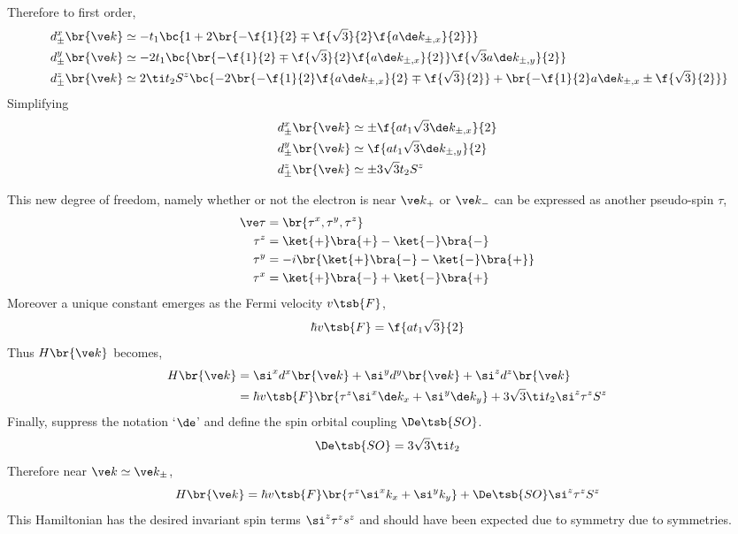 \documentclass{article}
\begin{document}
Therefore to first order,
\begin{align*}
    d_{\pm}^{x}\br{\ve k} &\simeq -t_1\bc{1 + 2\br{-\f{1}{2} \mp \f{\sqrt{3}}{2}\f{a\de k_{\pm,x}}{2}}} \\
    d_{\pm}^{y}\br{\ve k} &\simeq -2t_1\bc{\br{-\f{1}{2} \mp \f{\sqrt{3}}{2}\f{a\de k_{\pm,x}}{2}}\f{\sqrt{3}a\de k_{\pm, y}}{2}}\\\
    d_{\pm}^{z}\br{\ve k} &\simeq 2\ti t_2S^{z}\bc{-2 \br{-\f{1}{2}\f{a\de k_{\pm,x}}{2} \mp \f{\sqrt{3}}{2}} + \br{-\f{1}{2}a\de k_{\pm,x} \pm \f{\sqrt{3}}{2}}}
\end{align*}
Simplifying
\begin{align*}
    d_{\pm}^{x}\br{\ve k} &\simeq \pm \f{at_1 \sqrt{3}\de k_{\pm,x}}{2} \\
    d_{\pm}^{y}\br{\ve k} &\simeq \f{at_1 \sqrt{3}\de k_{\pm,y}}{2}\\
    d_{\pm}^{z}\br{\ve k} &\simeq \pm 3\sqrt{3}t_2S^{z}
\end{align*}

This new degree of freedom, namely whether or not the electron is near $\ve k_{+}$ or $\ve k_{-}$ can be expressed as another pseudo-spin $\tau$,
\begin{align*}
    \ve \tau &= \br{\tau^{x}, \tau^{y}, \tau^{z}} \\
    \tau^{z} &= \ket{+} \bra{+} - \ket{-}\bra{-} \\
    \tau^{y} &= -i\br{\ket{+} \bra{-} - \ket{-}\bra{+}} \\
    \tau^{x} &= \ket{+} \bra{-} + \ket{-}\bra{+}
\end{align*}
Moreover a unique constant emerges as the Fermi velocity $v\tsb{F}$,
\[ \hbar v\tsb{F} = \f{at_1 \sqrt{3}}{2}\]
Thus $H\br{\ve k}$ becomes,
\begin{align*}
H\br{\ve k}
&= \si^{x}d^{x}\br{\ve k} + \si^{y}d^{y}\br{\ve k} + \si^{z}d^{z}\br{\ve k} \\
&= \hbar v\tsb{F}\br{\tau^{z}\si^{x}\de k_{x} + \si^{y} \de k_{y}} + 3\sqrt{3} \ti t_2 \si^{z} \tau^{z} S^{z}
\end{align*}
Finally, suppress the notation `$\de$' and define the spin orbital coupling $\De\tsb{SO}$.
\[ \De\tsb{SO} = 3 \sqrt{3} \ti t_2 \]
Therefore near $\ve k \simeq \ve k_{\pm}$,
\[ H\br{\ve k} = \hbar v\tsb{F}\br{\tau^{z}\si^{x}k_{x} + \si^{y} k_{y}} + \De\tsb{SO} \si^{z} \tau^{z} S^{z} \]
This Hamiltonian has the desired invariant spin terms $\si^{z} \tau^{z} s^{z}$ and should have been expected due to symmetry due to symmetries.
\end{document}
